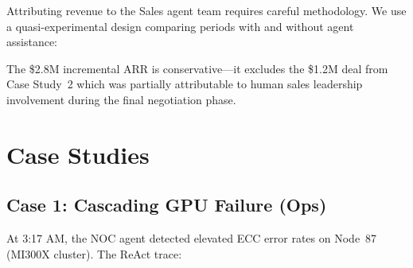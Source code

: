 \documentclass[conference,10pt,letterpaper]{IEEEtran}
\begin{document}
Attributing revenue to the Sales agent team requires careful methodology. We use a quasi-experimental design comparing periods with and without agent assistance:

\begin{table}[!t]
\caption{Revenue Attribution Analysis}
\label{tab:revenue}
\centering\scriptsize
{}
\end{table}

The \$2.8M incremental ARR is conservative---it excludes the \$1.2M deal from Case Study~2 which was partially attributable to human sales leadership involvement during the final negotiation phase.


\section{Case Studies}
\label{sec:cases}

\subsection{Case 1: Cascading GPU Failure (Ops)}

At 3:17 AM, the NOC agent detected elevated ECC error rates on Node~87 (MI300X cluster). The ReAct trace:
\end{document}
